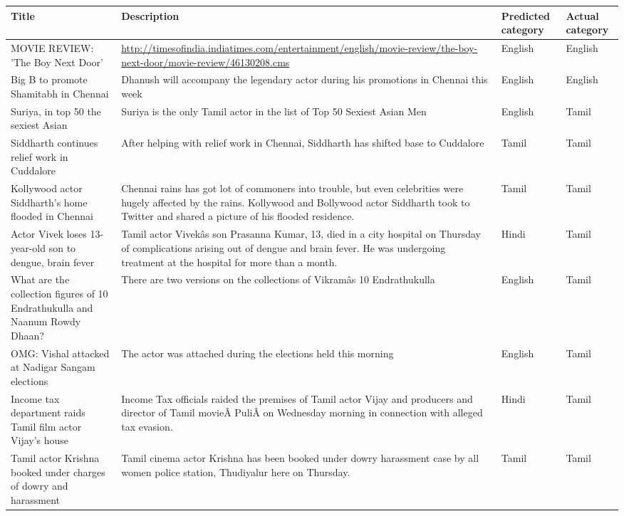 \begin{itemize}
\begin{table}
\newpage
\label{}
\begin{center}
\begin{longtable}{|p{3cm}|p{7cm}|p{1.5cm}|p{1.5cm}|}
\hline
\textbf{Title} & \textbf{Description} & \textbf{Predicted category} & \textbf{Actual category} \\ \hline
 MOVIE REVIEW: 'The Boy Next Door'&  \url{http://timesofindia.indiatimes.com/entertainment/english/movie-review/the-boy-next-door/movie-review/46130208.cms} &  English&  English\\ \hline
   Big B to promote Shamitabh in Chennai&  Dhanush will accompany the legendary actor during his promotions in Chennai this week&  English&  English\\ \hline
   Suriya, in top 50 the sexiest Asian&  Suriya is the only Tamil actor in the list of Top 50 Sexiest Asian Men&  English&  Tamil\\ \hline
   Siddharth continues relief work in Cuddalore&  After helping with relief work in Chennai, Siddharth has shifted base to Cuddalore&  Tamil&  Tamil\\
 Kollywood actor Siddharth's home flooded in Chennai& Chennai rains has got lot of commoners into trouble, but even celebrities were hugely affected by the rains. Kollywood and Bollywood actor Siddharth took to Twitter and shared a picture of his flooded residence.&  Tamil&  Tamil\\ \hline
   Actor Vivek loses 13-year-old son to dengue, brain fever&  Tamil actor Vivekâs son Prasanna Kumar, 13, died in a city hospital on Thursday of complications arising out of dengue and brain fever. He was undergoing treatment at the hospital for more than a month.&  Hindi&  Tamil\\ \hline
   What are the collection figures of 10 Endrathukulla and Naanum Rowdy Dhaan?&  There are two versions on the collections of Vikramâs 10 Endrathukulla&  English&  Tamil\\ \hline
   OMG: Vishal attacked at Nadigar Sangam elections& The actor was attached during the elections held this morning&  English&  Tamil\\ \hline
   Income tax department raids Tamil film actor Vijay's house&  Income Tax officials raided the premises of Tamil actor Vijay and producers and director of Tamil movieÂ PuliÂ on Wednesday morning in connection with alleged tax evasion.&  Hindi&  Tamil\\ \hline
   Tamil actor Krishna booked under charges of dowry and harassment&  Tamil cinema actor Krishna has been booked under dowry harassment case by all women police station, Thudiyalur here on Thursday.&  Tamil&  Tamil\\ \hline

\end{longtable}
\end{center}
\end{table}
\end{itemize}
